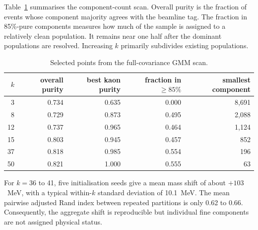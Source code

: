 \documentclass{article}
\begin{document}
Table~\ref{tab:k-scan} summarises the component-count scan. Overall purity is
the fraction of events whose component majority agrees with the beamline tag.
The fraction in 85\%-pure components measures how much of the sample is
assigned to a relatively clean population. It remains near one half after the
dominant populations are resolved. Increasing $k$ primarily subdivides
existing populations.

\begin{table}[h]
  \caption{Selected points from the full-covariance GMM scan.}
  \label{tab:k-scan}
  \centering
  \small
  \begin{tabular}{rrrrr}
    \toprule
    $k$ & overall purity & best kaon purity & fraction in $\geq85\%$ & smallest component \\
    \midrule
     3 & 0.734 & 0.635 & 0.000 & 8,691 \\
     8 & 0.729 & 0.873 & 0.495 & 2,088 \\
    12 & 0.737 & 0.965 & 0.464 & 1,124 \\
    15 & 0.803 & 0.945 & 0.457 &   852 \\
    37 & 0.818 & 0.985 & 0.554 &   196 \\
    50 & 0.821 & 1.000 & 0.555 &    63 \\
    \bottomrule
  \end{tabular}
\end{table}

For $k=36$ to 41, five initialisation seeds give a mean mass shift of about
$+103$~MeV, with a typical within-$k$ standard deviation of 10.1~MeV. The mean
pairwise adjusted Rand index between repeated partitions is only 0.62 to 0.66.
Consequently, the aggregate shift is reproducible but individual fine
components are not assigned physical status.
\end{document}
